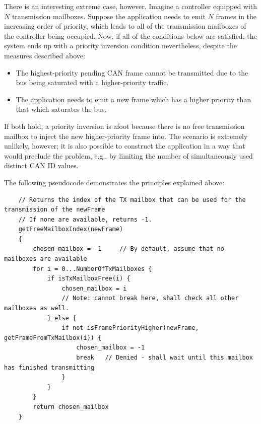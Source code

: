 \begin{remark}[breakable]
    There is an interesting extreme case, however.
    Imagine a controller equipped with $N$ transmission mailboxes.
    Suppose the application needs to emit $N$ frames in the increasing order of priority,
    which leads to all of the transmission mailboxes of the controller being occupied.
    Now, if all of the conditions below are satisfied, the system ends up with a priority inversion condition
    nevertheless, despite the measures described above:

    \begin{itemize}
        \item The highest-priority pending CAN frame cannot be transmitted due to the bus being saturated
        with a higher-priority traffic.
        \item The application needs to emit a new frame which has a higher priority than that which saturates the bus.
    \end{itemize}

    If both hold, a priority inversion is afoot because there is no free transmission mailbox to
    inject the new higher-priority frame into.
    The scenario is extremely unlikely, however;
    it is also possible to construct the application in a way that would preclude the problem,
    e.g., by limiting the number of simultaneously used distinct CAN ID values.

    The following pseudocode demonstrates the principles explained above:

    \begin{samepage}
    \begin{verbatim}
    // Returns the index of the TX mailbox that can be used for the transmission of the newFrame
    // If none are available, returns -1.
    getFreeMailboxIndex(newFrame)
    {
        chosen_mailbox = -1     // By default, assume that no mailboxes are available
        for i = 0...NumberOfTxMailboxes {
            if isTxMailboxFree(i) {
                chosen_mailbox = i
                // Note: cannot break here, shall check all other mailboxes as well.
            } else {
                if not isFramePriorityHigher(newFrame, getFrameFromTxMailbox(i)) {
                    chosen_mailbox = -1
                    break   // Denied - shall wait until this mailbox has finished transmitting
                }
            }
        }
        return chosen_mailbox
    }
    \end{verbatim}
    \end{samepage}
\end{remark}

